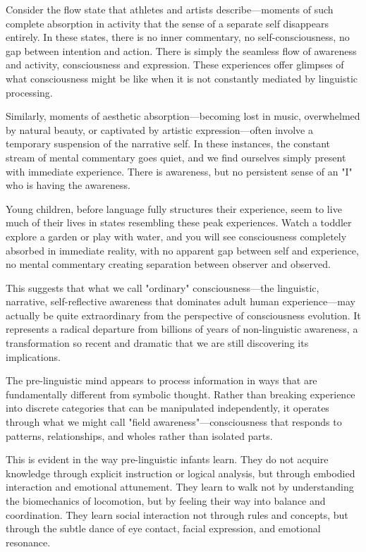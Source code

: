 Consider the flow state that athletes and artists describe—moments of such complete absorption in activity that the sense of a separate self disappears entirely. In these states, there is no inner commentary, no self-consciousness, no gap between intention and action. There is simply the seamless flow of awareness and activity, consciousness and expression. These experiences offer glimpses of what consciousness might be like when it is not constantly mediated by linguistic processing.

Similarly, moments of aesthetic absorption—becoming lost in music, overwhelmed by natural beauty, or captivated by artistic expression—often involve a temporary suspension of the narrative self. In these instances, the constant stream of mental commentary goes quiet, and we find ourselves simply present with immediate experience. There is awareness, but no persistent sense of an "I" who is having the awareness.

Young children, before language fully structures their experience, seem to live much of their lives in states resembling these peak experiences. Watch a toddler explore a garden or play with water, and you will see consciousness completely absorbed in immediate reality, with no apparent gap between self and experience, no mental commentary creating separation between observer and observed.

This suggests that what we call "ordinary" consciousness—the linguistic, narrative, self-reflective awareness that dominates adult human experience—may actually be quite extraordinary from the perspective of consciousness evolution. It represents a radical departure from billions of years of non-linguistic awareness, a transformation so recent and dramatic that we are still discovering its implications.

The pre-linguistic mind appears to process information in ways that are fundamentally different from symbolic thought. Rather than breaking experience into discrete categories that can be manipulated independently, it operates through what we might call "field awareness"—consciousness that responds to patterns, relationships, and wholes rather than isolated parts.

This is evident in the way pre-linguistic infants learn. They do not acquire knowledge through explicit instruction or logical analysis, but through embodied interaction and emotional attunement. They learn to walk not by understanding the biomechanics of locomotion, but by feeling their way into balance and coordination. They learn social interaction not through rules and concepts, but through the subtle dance of eye contact, facial expression, and emotional resonance.


